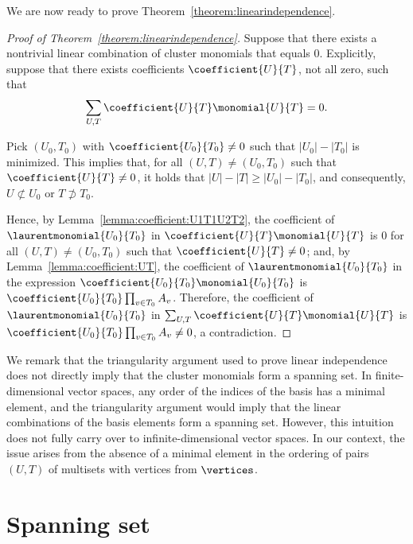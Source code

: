 We are now ready to prove Theorem~\ref{theorem:linearindependence}.

\begin{proof}[Proof of Theorem~\ref{theorem:linearindependence}]
    Suppose that there exists a nontrivial linear combination of cluster monomials that equals \(0\).
    Explicitly, suppose that there exists coefficients \(\coefficient{U}{T}\), not all zero, such that
    \begin{equation*}
        \sum_{U, T} \coefficient{U}{T} \monomial{U}{T} = 0.
    \end{equation*}

    Pick \((U_0, T_0)\) with \(\coefficient{U_0}{T_0} \neq 0\) such that \(|U_0| - |T_0|\) is minimized.
    This implies that, for all \((U, T) \neq (U_0, T_0)\) such that \(\coefficient{U}{T} \neq 0\),
    it holds that \(|U| - |T| \geq |U_0| - |T_0|\), and consequently, \(U \not\subset U_0\) or \(T \not\supset T_0\).

    Hence, by Lemma~\ref{lemma:coefficient:U1T1U2T2}, the coefficient of \(\laurentmonomial{U_0}{T_0}\) in 
    \( \coefficient{U}{T} \monomial{U}{T} \)
    is \(0\)
    for all \((U, T) \neq (U_0, T_0)\) such that \(\coefficient{U}{T} \neq 0\);
    and, by Lemma~\ref{lemma:coefficient:UT}, the coefficient of \(\laurentmonomial{U_0}{T_0}\) in the expression
    \( \coefficient{U_0}{T_0} \monomial{U_0}{T_0} \)
    is 
    \( \coefficient{U_0}{T_0} \prod_{v \in T_0} A_v \).
    Therefore, the coefficient of \(\laurentmonomial{U_0}{T_0}\) in
    \( \sum_{U, T} \coefficient{U}{T} \monomial{U}{T} \)
    is
    \( \coefficient{U_0}{T_0} \prod_{v \in T_0} A_v \neq 0\),
    a contradiction.
\end{proof}

We remark that the triangularity argument used to prove linear independence does not directly imply that the cluster monomials form a spanning set.
In finite-dimensional vector spaces, any order of the indices of the basis has a minimal element,
and the triangularity argument would imply that the linear combinations of the basis elements form a spanning set.
However, this intuition does not fully carry over to infinite-dimensional vector spaces.
In our context, the issue arises from the absence of a minimal element in the ordering of pairs \((U, T)\) of multisets with vertices from \(\vertices\).

\section{Spanning set} \label{section:spanningset}

